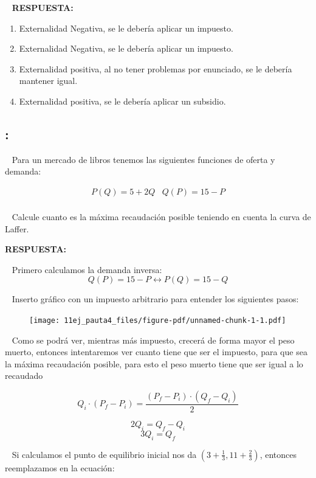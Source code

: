 \documentclass[
  letterpaper,
  DIV=11,
  numbers=noendperiod]{scrreport}
\providecommand{\tightlist}{%
  \setlength{\itemsep}{0pt}\setlength{\parskip}{0pt}}\usepackage{longtable,booktabs,array}
\begin{document}
~ \textbf{RESPUESTA:}

\begin{enumerate}
\def\labelenumi{\arabic{enumi})}
\tightlist
\item
  Externalidad Negativa, se le debería aplicar un impuesto.
\item
  Externalidad Negativa, se le debería aplicar un impuesto.
\item
  Externalidad positiva, al no tener problemas por enunciado, se le
  debería mantener igual.
\item
  Externalidad positiva, se le debería aplicar un subsidio.
\end{enumerate}

\hypertarget{section-35}{%
\subsection{:}\label{section-35}}

~ Para un mercado de libros tenemos las siguientes funciones de oferta y
demanda:

\[
\begin{array}{cc} P(Q)=5+2Q & Q(P)=15-P\\\end{array}
\]

~ Calcule cuanto es la máxima recaudación posible teniendo en cuenta la
curva de Laffer.

\textbf{RESPUESTA:}

~ Primero calculamos la demanda inversa: \[
Q(P)=15-P \longleftrightarrow P(Q)=15-Q
\]

~ Inserto gráfico con un impuesto arbitrario para entender los
siguientes pasos:

\begin{figure}

{\centering \texttt{[image: 11ej\_pauta4\_files/figure-pdf/unnamed-chunk-1-1.pdf]}

}

\end{figure}

~ Como se podrá ver, mientras más impuesto, crecerá de forma mayor el
peso muerto, entonces intentaremos ver cuanto tiene que ser el impuesto,
para que sea la máxima recaudación posible, para esto el peso muerto
tiene que ser igual a lo recaudado

\[
Q_i\cdot (P_f-P_i)=\frac{(P_f-P_i)\cdot (Q_f-Q_i)}{2}
\]

\[
2Q_i=Q_f-Q_i
\] \[
3Q_i=Q_f
\]

~ Si calculamos el punto de equilibrio inicial nos da
\((3+\frac{1}{3},11+\frac{2}{3})\), entonces reemplazamos en la
ecuación:
\end{document}
